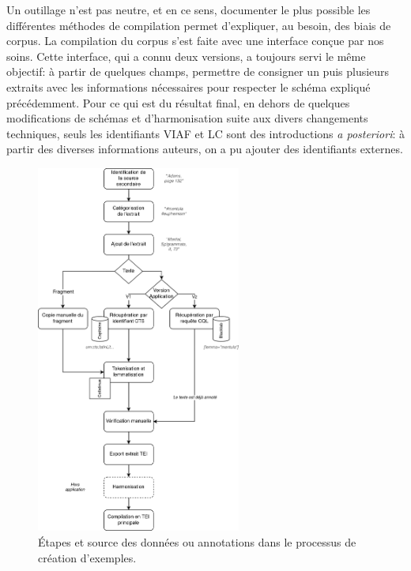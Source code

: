 Un outillage n'est pas neutre, et en ce sens, documenter le plus possible les différentes méthodes de compilation permet d'expliquer, au besoin, des biais de corpus. La compilation du corpus s'est faite avec une interface conçue par nos soins. Cette interface, qui a connu deux versions, a toujours servi le même objectif: à partir de quelques champs, permettre de consigner un puis plusieurs extraits avec les informations nécessaires pour respecter le schéma expliqué précédemment. Pour ce qui est du résultat final, en dehors de quelques modifications de schémas et d'harmonisation suite aux divers changements techniques, seuls les identifiants VIAF et LC sont des introductions \textit{a posteriori}: à partir des diverses informations auteurs, on a pu ajouter des identifiants externes.

\begin{figure}
    \centering
    \includegraphics[width=0.6\textwidth]{figures/chap1/part3/exemplier/corpus_builder_workflow.png}
    \caption{Étapes et source des données ou annotations dans le processus de création d'exemples.}
    \label{fig:chap1:corpus_builder_workflow}
\end{figure}

